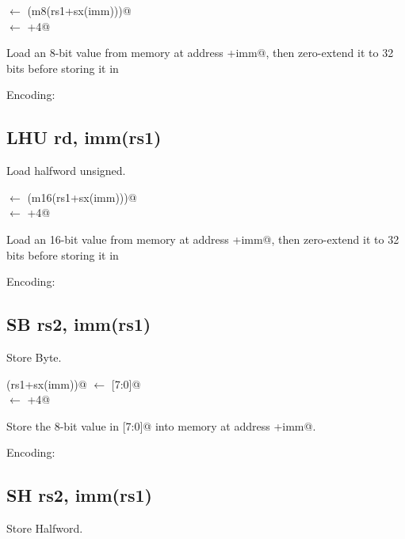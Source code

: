 \verb@rd@ $\leftarrow$ \verb@zx(m8(rs1+sx(imm)))@\\
\verb@pc@ $\leftarrow$ \verb@pc+4@

Load an 8-bit value from memory at address +imm@, then 
zero-extend it to 32 bits before storing it in \verb@rd@

Encoding:


\subsection{LHU rd, imm(rs1)}

Load halfword unsigned.

\verb@rd@ $\leftarrow$ \verb@zx(m16(rs1+sx(imm)))@\\
\verb@pc@ $\leftarrow$ \verb@pc+4@

Load an 16-bit value from memory at address +imm@, then 
zero-extend it to 32 bits before storing it in \verb@rd@

Encoding:


\subsection{SB rs2, imm(rs1)}

Store Byte.

(rs1+sx(imm))@ $\leftarrow$ [7:0]@\\
\verb@pc@ $\leftarrow$ \verb@pc+4@

Store the 8-bit value in [7:0]@ into memory at 
address +imm@.

Encoding:


\subsection{SH rs2, imm(rs1)}

Store Halfword.

